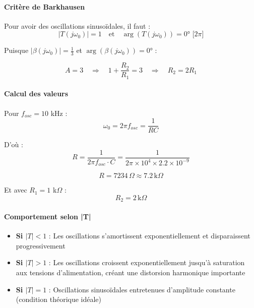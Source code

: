 \documentclass[11pt,a4paper]{article}
\begin{document}
\paragraph{Critère de Barkhausen}

Pour avoir des oscillations sinusoïdales, il faut :
\begin{equation}
\boxed{|T(j\omega_0)| = 1 \quad \text{et} \quad \arg(T(j\omega_0)) = 0° \text{ [2}\pi\text{]}}
\end{equation}

Puisque $|\beta(j\omega_0)| = \frac{1}{3}$ et $\arg(\beta(j\omega_0)) = 0°$ :

\begin{equation}
\boxed{A = 3 \quad \Rightarrow \quad 1 + \frac{R_2}{R_1} = 3 \quad \Rightarrow \quad R_2 = 2R_1}
\end{equation}

\paragraph{Calcul des valeurs}

Pour $f_{osc} = 10$ kHz :
\begin{equation}
\omega_0 = 2\pi f_{osc} = \frac{1}{RC}
\end{equation}

D'où :
\begin{equation}
R = \frac{1}{2\pi f_{osc} \cdot C} = \frac{1}{2\pi \times 10^4 \times 2.2 \times 10^{-9}}
\end{equation}

\begin{equation}
\boxed{R = 7234 \, \Omega \approx 7.2 \, \text{k}\Omega}
\end{equation}

Et avec $R_1 = 1$ k$\Omega$ :
\begin{equation}
\boxed{R_2 = 2 \, \text{k}\Omega}
\end{equation}

\paragraph{Comportement selon |T|}

\begin{itemize}
    \item \textbf{Si $|T| < 1$} : Les oscillations s'amortissent exponentiellement et disparaissent progressivement
    \item \textbf{Si $|T| > 1$} : Les oscillations croissent exponentiellement jusqu'à saturation aux tensions d'alimentation, créant une distorsion harmonique importante
    \item \textbf{Si $|T| = 1$} : Oscillations sinusoïdales entretenues d'amplitude constante (condition théorique idéale)
\end{itemize}
\end{document}
